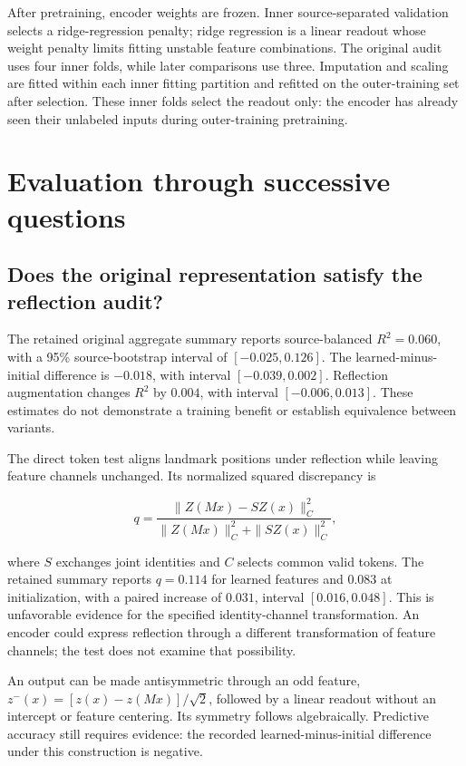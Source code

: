 \documentclass{article}
\begin{document}
After pretraining, encoder weights are frozen. Inner source-separated validation selects a ridge-regression penalty; ridge regression is a linear readout whose weight penalty limits fitting unstable feature combinations. The original audit uses four inner folds, while later comparisons use three. Imputation and scaling are fitted within each inner fitting partition and refitted on the outer-training set after selection. These inner folds select the readout only: the encoder has already seen their unlabeled inputs during outer-training pretraining.

\section{Evaluation through successive questions}\label{evaluation-through-successive-questions}

\subsection{Does the original representation satisfy the reflection audit?}\label{does-the-original-representation-satisfy-the-reflection-audit}

The retained original aggregate summary reports source-balanced \(R^2=0.060\), with a 95\% source-bootstrap interval of \([-0.025,0.126]\). The learned-minus-initial difference is \(-0.018\), with interval \([-0.039,0.002]\). Reflection augmentation changes \(R^2\) by \(0.004\), with interval \([-0.006,0.013]\). These estimates do not demonstrate a training benefit or establish equivalence between variants.

The direct token test aligns landmark positions under reflection while leaving feature channels unchanged. Its normalized squared discrepancy is

\[
q=\frac{\|Z(Mx)-SZ(x)\|_C^2}
{\|Z(Mx)\|_C^2+\|SZ(x)\|_C^2},
\]

where \(S\) exchanges joint identities and \(C\) selects common valid tokens. The retained summary reports \(q=0.114\) for learned features and \(0.083\) at initialization, with a paired increase of \(0.031\), interval \([0.016,0.048]\). This is unfavorable evidence for the specified identity-channel transformation. An encoder could express reflection through a different transformation of feature channels; the test does not examine that possibility.

An output can be made antisymmetric through an odd feature, \(z^-(x)=[z(x)-z(Mx)]/\sqrt{2}\), followed by a linear readout without an intercept or feature centering. Its symmetry follows algebraically. Predictive accuracy still requires evidence: the recorded learned-minus-initial difference under this construction is negative.
\end{document}
